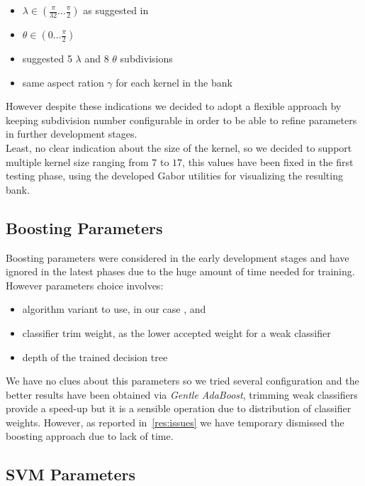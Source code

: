 \begin{itemize}
\item $\lambda \in ( \frac{\pi}{32} \ldots \frac{\pi}{2} ) $ as suggested in \cite{Lades93distortioninvariant}
\item $\theta \in ( 0 \ldots \frac{\pi}{2} )$
\item suggested 5 $\lambda$ and 8 $\theta$ subdivisions
\item same aspect ration $\gamma$ for each kernel in the bank
\end{itemize}

However despite these indications we decided to adopt a flexible approach by keeping subdivision number configurable in order to be able to refine parameters in further development stages. \\
Least, no clear indication about the size of the kernel, so we decided to support multiple kernel size ranging from $7$ to $17$, this values have been fixed in the first testing phase, using the developed Gabor utilities for visualizing the resulting bank. 

\subsection{Boosting Parameters}

Boosting parameters were considered in the early development stages and have ignored in the latest phases due to the huge amount of time needed for  training. However parameters choice involves:

\begin{itemize}
\item algorithm variant to use, in our case ,  and  
\item classifier trim weight, as the lower accepted weight for a weak classifier
\item depth of the trained decision tree
\end{itemize}

We have no clues about this parameters so we tried several configuration and the better results have been obtained via \emph{Gentle AdaBoost}, trimming weak classifiers provide a speed-up but it is a sensible operation due to distribution of classifier weights. However, as reported in~\ref{res:issues} we have temporary dismissed the boosting approach due to lack of time.

\subsection{SVM Parameters}

